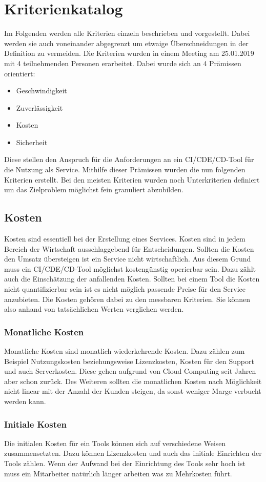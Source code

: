 \section{Kriterienkatalog}
Im Folgenden werden alle Kriterien einzeln beschrieben und vorgestellt. Dabei werden sie auch voneinander abgegrenzt um etwaige Überschneidungen in der Definition zu vermeiden. Die Kriterien wurden in einem Meeting am 25.01.2019 mit 4 teilnehmenden Personen erarbeitet. Dabei wurde sich an 4 Prämissen orientiert: 
\begin{itemize}
	\item Geschwindigkeit
	\item Zuverlässigkeit
	\item Kosten
	\item Sicherheit
\end{itemize}
Diese stellen den Anspruch für die Anforderungen an ein \ac{CI}/\ac{CDE}/\ac{CD}-Tool für die Nutzung als Service. Mithilfe dieser Prämissen wurden die nun folgenden Kriterien erstellt. Bei den meisten Kriterien wurden noch Unterkriterien definiert um das Zielproblem möglichst fein granuliert abzubilden. 
\subsection{Kosten}
Kosten sind essentiell bei der Erstellung eines Services. Kosten sind in jedem Bereich der Wirtschaft ausschlaggebend für Entscheidungen. Sollten die Kosten den Umsatz übersteigen ist ein Service nicht wirtschaftlich. Aus diesem Grund muss ein \ac{CI}/\ac{CDE}/\ac{CD}-Tool möglichst kostengünstig operierbar sein. Dazu zählt auch die Einschätzung der anfallenden Kosten. Sollten bei einem Tool die Kosten nicht quantifizierbar sein ist es nicht möglich passende Preise für den Service anzubieten. Die Kosten gehören dabei zu den messbaren Kriterien. Sie können also anhand von tatsächlichen Werten verglichen werden.
\subsubsection{Monatliche Kosten}
Monatliche Kosten sind monatlich wiederkehrende Kosten. Dazu zählen zum Beispiel Nutzungskosten beziehungsweise Lizenzkosten, Kosten für den Support und auch Serverkosten. Diese gehen aufgrund von Cloud Computing seit Jahren aber schon zurück. Des Weiteren sollten die monatlichen Kosten nach Möglichkeit nicht linear mit der Anzahl der Kunden steigen, da sonst weniger Marge verbucht werden kann.
\subsubsection{Initiale Kosten}
Die initialen Kosten für ein Tools können sich auf verschiedene Weisen zusammensetzten. Dazu können Lizenzkosten und auch das initiale Einrichten der Tools zählen. Wenn der Aufwand bei der Einrichtung des Tools sehr hoch ist muss ein Mitarbeiter natürlich länger arbeiten was zu Mehrkosten führt. 
